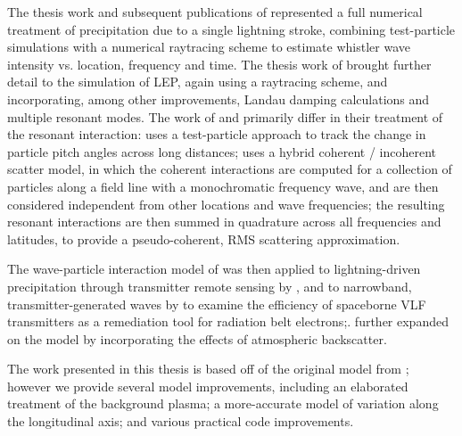 The thesis work and subsequent publications of \citeauthor{Lauben1998} \citep{Lauben1998, Lauben1999, Lauben2001} represented a full numerical treatment of precipitation due to a single lightning stroke, combining test-particle simulations with a numerical raytracing scheme to estimate whistler wave intensity vs. location, frequency and time. The thesis work of \cite{Bortnik2005} brought further detail to the simulation of LEP, again using a raytracing scheme, and incorporating, among other improvements, Landau damping calculations and multiple resonant modes. The work of \citeauthor{Lauben1998} and \citeauthor{Bortnik2005} primarily differ in their treatment of the resonant interaction: \citeauthor{Lauben1998} uses a test-particle approach to track the change in particle pitch angles across long distances; \citeauthor{Bortnik2005} uses a hybrid coherent / incoherent scatter model, in which the coherent interactions are computed for a collection of particles along a field line with a monochromatic frequency wave, and are then considered independent from other locations and wave frequencies; the resulting resonant interactions are then summed in quadrature across all frequencies and latitudes, to provide a pseudo-coherent, RMS scattering approximation.

The wave-particle interaction model of \cite{Bortnik2005, Bortnik2006} was then applied to lightning-driven precipitation through transmitter remote sensing by \cite{Peter2007}, and to narrowband, transmitter-generated waves by \cite{Kulkarni2009} to examine the efficiency of spaceborne VLF transmitters as a remediation tool for radiation belt electrons;. \cite{Cotts2011} further expanded on the \citeauthor{Bortnik2005} model by incorporating the effects of atmospheric backscatter.

The work presented in this thesis is based off of the original model from \cite{Bortnik2005}; however we provide several model improvements, including an elaborated treatment of the background plasma; a more-accurate model of variation along the longitudinal axis; and various practical code improvements.

